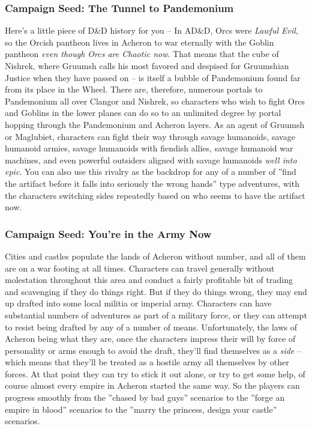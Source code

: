\subsubsection{Campaign Seed: The Tunnel to Pandemonium}

Here's a little piece of D\&D history for you -- In AD\&D, Orcs were \textit{Lawful Evil}, so the Orcish pantheon lives in Acheron to war eternally with the Goblin pantheon \textit{even though Orcs are Chaotic now}. That means that the cube of Nishrek, where Gruumsh calls his most favored and despised for Gruumshian Justice when they have passed on -- is itself a bubble of Pandemonium found far from its place in the Wheel. There are, therefore, numerous portals to Pandemonium all over Clangor and Nishrek, so characters who wish to fight Orcs and Goblins in the lower planes can do so to an unlimited degree by portal hopping through the Pandemonium and Acheron layers. As an agent of Gruumsh or Maglubiet, characters can fight their way through savage humanoids, savage humanoid armies, savage humanoids with fiendish allies, savage humanoid war machines, and even powerful outsiders aligned with savage humanoids \textit{well into epic}. You can also use this rivalry as the backdrop for any of a number of ''find the artifact before it falls into seriously the wrong hands'' type adventures, with the characters switching sides repeatedly based on who seems to have the artifact now.

\subsubsection{Campaign Seed: You're in the Army Now}

Cities and castles populate the lands of Acheron without number, and all of them are on a war footing at all times. Characters can travel generally without molestation throughout this area and conduct a fairly profitable bit of trading and scavenging if they do things right. But if they do things wrong, they may end up drafted into some local militia or imperial army. Characters can have substantial numbers of adventures as part of a military force, or they can attempt to resist being drafted by any of a number of means. Unfortunately, the laws of Acheron being what they are, once the characters impress their will by force of personality or arms enough to avoid the draft, they'll find themselves as a \textit{side} -- which means that they'll be treated as a hostile army all themselves by other forces. At that point they can try to stick it out alone, or try to get some help, of course almost every empire in Acheron started the same way. So the players can progress smoothly from the ''chased by bad guys'' scenarios to the ''forge an empire in blood'' scenarios to the ''marry the princess, design your castle'' scenarios.


